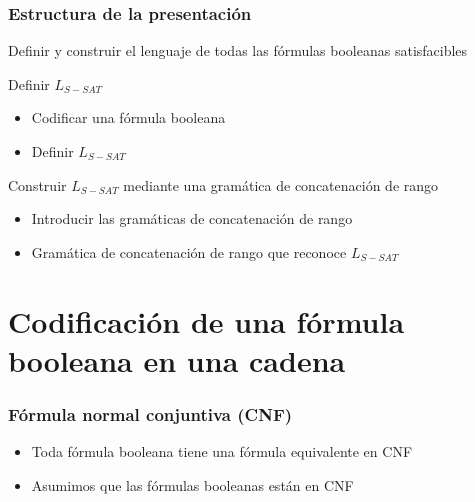 \documentclass{beamer}
\begin{document}


\begin{frame}
    \frametitle{Estructura de la presentación}

    Definir y construir el lenguaje de todas las fórmulas booleanas satisfacibles

    \begin{block}{Definir $L_{S-SAT}$}
        \begin{itemize}
            \item Codificar una fórmula booleana
            \item Definir $L_{S-SAT}$
        \end{itemize}
    \end{block}


    \begin{block}{Construir $L_{S-SAT}$ mediante una gramática de concatenación de rango}
        \begin{itemize}
            \item Introducir las gramáticas de concatenación de rango
            \item Gramática de concatenación de rango que reconoce $L_{S-SAT}$
        \end{itemize}
    \end{block}
\end{frame}

\section{Codificación de una fórmula booleana en una cadena}

\begin{frame}
    \frametitle{Fórmula normal conjuntiva (CNF)}

    \begin{itemize}
        \item Toda fórmula booleana tiene una fórmula equivalente en CNF
              \pause
        \item Asumimos que las fórmulas booleanas están en CNF
    \end{itemize}

\end{frame}
\end{document}
